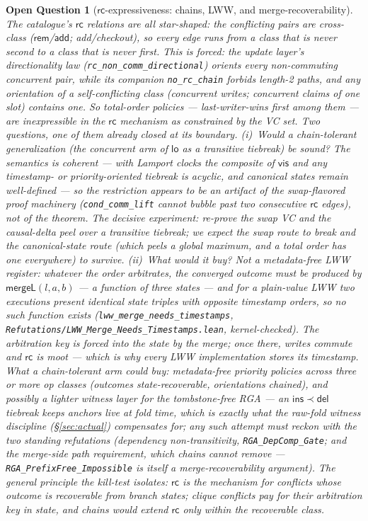\documentclass[11pt]{article}
\newtheorem{openq}[theorem]{Open Question}
\newcommand{\add}{\mathsf{add}}
\newcommand{\rem}{\mathsf{rem}}
\newcommand{\mergeL}{\mathsf{mergeL}}
\newcommand{\lean}[1]{\texttt{#1}}
\begin{document}
\begin{openq}[$\mathsf{rc}$-expressiveness: chains, LWW, and
merge-recoverability]
\label{oq:rcchain}
The catalogue's $\mathsf{rc}$ relations are all \emph{star-shaped}: the
conflicting pairs are cross-class ($\rem$/$\add$; add/checkout), so every
edge runs from a class that is never second to a class that is never
first. This is forced: the update layer's directionality law
(\lean{rc\_non\_comm\_directional}) orients every non-commuting concurrent
pair, while its companion \lean{no\_rc\_chain} forbids length-2 paths, and any orientation of a \emph{self}-conflicting
class (concurrent writes; concurrent claims of one slot) contains one. So
total-order policies --- last-writer-wins first among them --- are
inexpressible in the $\mathsf{rc}$ mechanism as constrained by the VC set.
Two questions, one of them already closed at its boundary. (i)~Would a
\emph{chain-tolerant} generalization (the concurrent arm of $\mathsf{lo}$ as a
transitive tiebreak) be sound? The semantics is coherent --- with Lamport
clocks the composite of $\mathsf{vis}$ and any timestamp- or priority-oriented
tiebreak is acyclic, and canonical states remain well-defined --- so the
restriction appears to be an artifact of the swap-flavored proof
machinery (\lean{cond\_comm\_lift} cannot bubble past two consecutive
$\mathsf{rc}$ edges), not of the theorem. The decisive experiment:
re-prove the swap VC and the causal-delta peel over a transitive
tiebreak; we expect the swap route to break and the canonical-state route
(which peels a global maximum, and a total order has one everywhere) to
survive. (ii)~What would it buy? \emph{Not} a metadata-free LWW register:
whatever the order arbitrates, the converged outcome must be produced by
$\mergeL(l,a,b)$ --- a function of three \emph{states} --- and for a
plain-value LWW two executions present identical state triples with
opposite timestamp orders, so no such function exists
(\lean{lww\_merge\_needs\_timestamps},
\lean{Refutations/LWW\_Merge\_Needs\_Timestamps.lean}, kernel-checked).
The arbitration key is forced into the state by the \emph{merge}; once
there, writes commute and $\mathsf{rc}$ is moot --- which is why every
LWW implementation stores its timestamp. What a chain-tolerant arm
\emph{could} buy: metadata-free \emph{priority} policies across three or
more op classes (outcomes state-recoverable, orientations chained), and
possibly a lighter witness layer for the tombstone-free RGA --- an
$\mathsf{ins} \prec \mathsf{del}$ tiebreak keeps anchors live at fold
time, which is exactly what the raw-fold witness discipline
(\S\ref{sec:actual}) compensates for; any such attempt must reckon with
the two standing refutations (dependency non-transitivity,
\lean{RGA\_DepComp\_Gate}; and the merge-side path requirement, which
chains cannot remove --- \lean{RGA\_PrefixFree\_Impossible} is itself a
merge-recoverability argument). The general principle the kill-test
isolates: $\mathsf{rc}$ is the mechanism for conflicts whose outcome is
recoverable from branch states; clique conflicts pay for their arbitration
key in state, and chains would extend $\mathsf{rc}$ only within the
recoverable class.
\end{openq}
\end{document}
